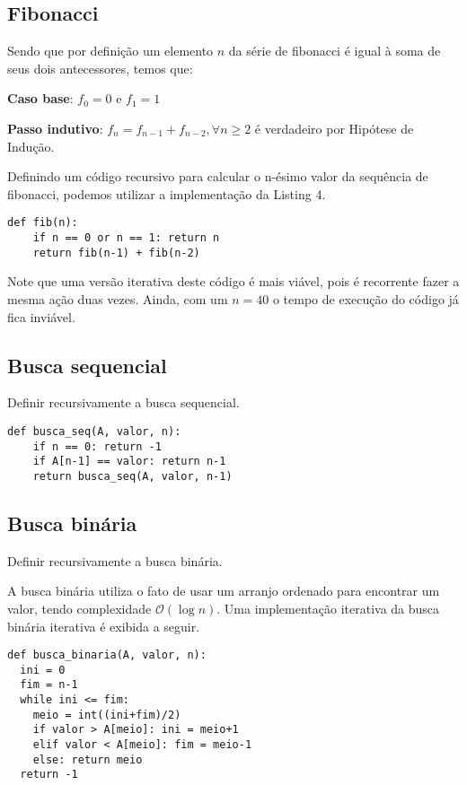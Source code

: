 \documentclass[a4paper, twocolumn]{article}
\theoremstyle{definition}
\begin{document}
\subsection{Fibonacci}
Sendo que por definição um elemento $n$ da série de fibonacci é igual à soma de seus dois antecessores, temos que:

\textbf{Caso base}: $f_0 = 0$ e $f_1 = 1$

\textbf{Passo indutivo}: $f_n = f_{n-1} + f_{n-2}, \forall n \geq 2$ é verdadeiro por Hipótese de Indução.

Definindo um código recursivo para calcular o n-ésimo valor da sequência de fibonacci, podemos utilizar a implementação da Listing 4.

\begin{lstlisting}[label=fibonacci,caption= Fionacci recursivo]
def fib(n):
	if n == 0 or n == 1: return n
	return fib(n-1) + fib(n-2)
\end{lstlisting}

Note que uma versão iterativa deste código é mais viável, pois é recorrente fazer a mesma ação duas vezes. Ainda, com um $n=40$ o tempo de execução do código já fica inviável.

\subsection{Busca sequencial}
Definir recursivamente a busca sequencial.

\begin{lstlisting}[label=busca_seqa,caption= Busca sequencial recursiva]
def busca_seq(A, valor, n):
	if n == 0: return -1
	if A[n-1] == valor: return n-1
	return busca_seq(A, valor, n-1)
\end{lstlisting}

\subsection{Busca binária}
Definir recursivamente a busca binária.

A busca binária utiliza o fato de usar um arranjo ordenado para encontrar um valor, tendo complexidade $\mathcal{O}(\log n)$. Uma implementação iterativa da busca binária iterativa é exibida a seguir.
\begin{lstlisting}[label=busca_binaria_iter,caption= Busca binária iterativa]
def busca_binaria(A, valor, n):
  ini = 0
  fim = n-1
  while ini <= fim:
    meio = int((ini+fim)/2)
	if valor > A[meio]: ini = meio+1
	elif valor < A[meio]: fim = meio-1
	else: return meio
  return -1
\end{lstlisting}
\end{document}
